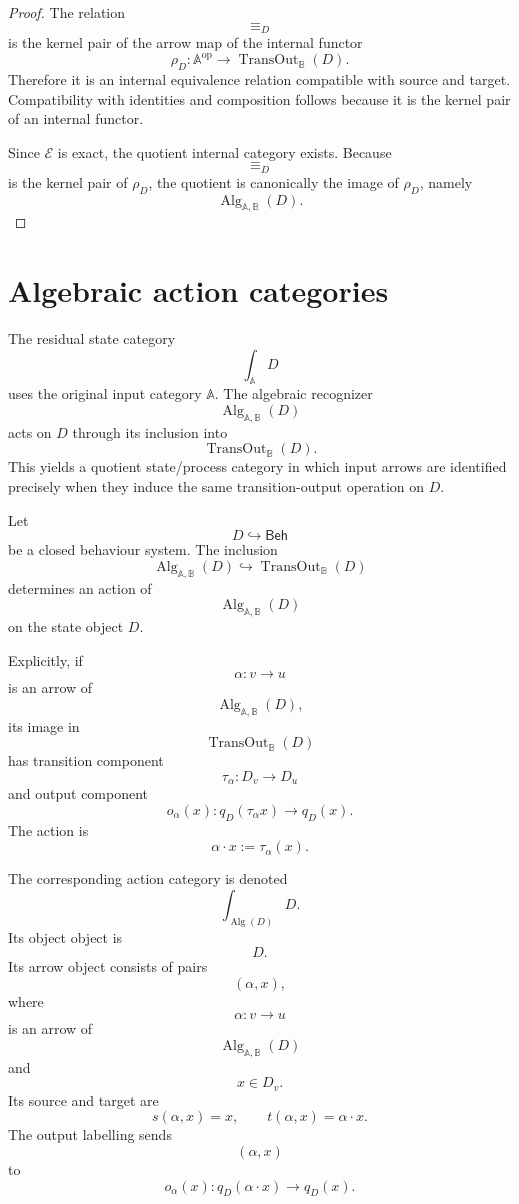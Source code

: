 \begin{proof}
The relation
\[
{\equiv_D}
\]
is the kernel pair of the arrow map of the internal functor
\[
\rho_D:
\mathbb A^{\mathrm{op}}
\to
\operatorname{TransOut}_{\mathbb B}(D).
\]
Therefore it is an internal equivalence relation compatible with source and
target. Compatibility with identities and composition follows because it is
the kernel pair of an internal functor.

Since \(\mathcal E\) is exact, the quotient internal category exists. Because
\[
{\equiv_D}
\]
is the kernel pair of \(\rho_D\), the quotient is canonically the image of
\(\rho_D\), namely
\[
\operatorname{Alg}_{\mathbb A,\mathbb B}(D).
\]
\end{proof}

\section{Algebraic action categories}
\label{sec:eilenberg-algebraic-action-categories}

The residual state category
\[
\int_{\mathbb A}D
\]
uses the original input category \(\mathbb A\). The algebraic recognizer
\[
\operatorname{Alg}_{\mathbb A,\mathbb B}(D)
\]
acts on \(D\) through its inclusion into
\[
\operatorname{TransOut}_{\mathbb B}(D).
\]
This yields a quotient state/process category in which input arrows are
identified precisely when they induce the same transition-output operation
on \(D\).

\begin{definition}
\label{def:eilenberg-algebraic-action-category}
Let
\[
D\hookrightarrow\mathsf{Beh}
\]
be a closed behaviour system. The inclusion
\[
\operatorname{Alg}_{\mathbb A,\mathbb B}(D)
\hookrightarrow
\operatorname{TransOut}_{\mathbb B}(D)
\]
determines an action of
\[
\operatorname{Alg}_{\mathbb A,\mathbb B}(D)
\]
on the state object \(D\).

Explicitly, if
\[
\alpha:v\to u
\]
is an arrow of
\[
\operatorname{Alg}_{\mathbb A,\mathbb B}(D),
\]
its image in
\[
\operatorname{TransOut}_{\mathbb B}(D)
\]
has transition component
\[
\tau_\alpha:D_v\to D_u
\]
and output component
\[
o_\alpha(x):q_D(\tau_\alpha x)\to q_D(x).
\]
The action is
\[
\alpha\cdot x:=\tau_\alpha(x).
\]

The corresponding action category is denoted
\[
\int_{\operatorname{Alg}(D)}D.
\]
Its object object is
\[
D.
\]
Its arrow object consists of pairs
\[
(\alpha,x),
\]
where
\[
\alpha:v\to u
\]
is an arrow of
\[
\operatorname{Alg}_{\mathbb A,\mathbb B}(D)
\]
and
\[
x\in D_v.
\]
Its source and target are
\[
s(\alpha,x)=x,
\qquad
t(\alpha,x)=\alpha\cdot x.
\]
The output labelling sends
\[
(\alpha,x)
\]
to
\[
o_\alpha(x):q_D(\alpha\cdot x)\to q_D(x).
\]
\end{definition}

